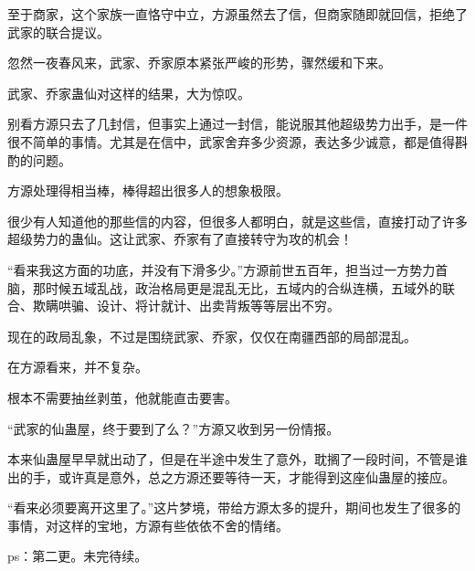 \begin{this_body}
至于商家，这个家族一直恪守中立，方源虽然去了信，但商家随即就回信，拒绝了武家的联合提议。

忽然一夜春风来，武家、乔家原本紧张严峻的形势，骤然缓和下来。

武家、乔家蛊仙对这样的结果，大为惊叹。

别看方源只去了几封信，但事实上通过一封信，能说服其他超级势力出手，是一件很不简单的事情。尤其是在信中，武家舍弃多少资源，表达多少诚意，都是值得斟酌的问题。

方源处理得相当棒，棒得超出很多人的想象极限。

很少有人知道他的那些信的内容，但很多人都明白，就是这些信，直接打动了许多超级势力的蛊仙。这让武家、乔家有了直接转守为攻的机会！

“看来我这方面的功底，并没有下滑多少。”方源前世五百年，担当过一方势力首脑，那时候五域乱战，政治格局更是混乱无比，五域内的合纵连横，五域外的联合、欺瞒哄骗、设计、将计就计、出卖背叛等等层出不穷。

现在的政局乱象，不过是围绕武家、乔家，仅仅在南疆西部的局部混乱。

在方源看来，并不复杂。

根本不需要抽丝剥茧，他就能直击要害。

“武家的仙蛊屋，终于要到了么？”方源又收到另一份情报。

本来仙蛊屋早早就出动了，但是在半途中发生了意外，耽搁了一段时间，不管是谁出的手，或许真是意外，总之方源还要等待一天，才能得到这座仙蛊屋的接应。

“看来必须要离开这里了。”这片梦境，带给方源太多的提升，期间也发生了很多的事情，对这样的宝地，方源有些依依不舍的情绪。

ps：第二更。未完待续。

\end{this_body}

